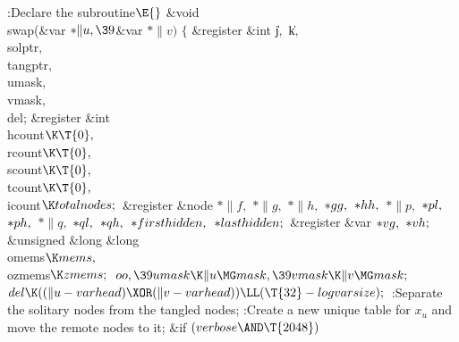 \Y\B\4:Declare the  subroutine\X${}\E{}$\6
\&{void} \\{swap}(\&{var} ${}{*}\|u,\39{}$\&{var} ${}{*}\|v){}$\1\1\2\2\6
${}\{{}$\1\6
\&{register} \&{int} \|j${},{}$ \|k${},{}$ \\{solptr}${},{}$ \\{tangptr}${},{}$
\\{umask}${},{}$ \\{vmask}${},{}$ \\{del};\6
\&{register} \&{int} \\{hcount}${}\K\T{0},{}$ \\{rcount}${}\K\T{0},{}$ %
\\{scount}${}\K\T{0},{}$ \\{tcount}${}\K\T{0},{}$ \\{icount}${}\K%
\\{totalnodes};{}$\6
\&{register} \&{node} ${}{*}\|f,{}$ ${}{*}\|g,{}$ ${}{*}\|h,{}$ ${}{*}%
\\{gg},{}$ ${}{*}\\{hh},{}$ ${}{*}\|p,{}$ ${}{*}\\{pl},{}$ ${}{*}\\{ph},{}$
${}{*}\|q,{}$ ${}{*}\\{ql},{}$ ${}{*}\\{qh},{}$ ${}{*}\\{firsthidden},{}$
${}{*}\\{lasthidden};{}$\6
\&{register} \&{var} ${}{*}\\{vg},{}$ ${}{*}\\{vh};{}$\6
\&{unsigned} \&{long} \&{long} \\{omems}${}\K\\{mems},{}$ \\{ozmems}${}\K%
\\{zmems};{}$\7
${}\\{oo},\39\\{umask}\K\|u\MG\\{mask},\39\\{vmask}\K\|v\MG\\{mask};{}$\6
${}\\{del}\K((\|u-\\{varhead})\XOR(\|v-\\{varhead}))\LL(\T{32}-%
\\{logvarsize});{}$\6
:Separate the solitary nodes from the tangled nodes\X;\6
:Create a new unique table for $x_u$ and move the remote nodes to it\X;\6
\&{if} ${}(\\{verbose}\AND\T{2048}){}$\1\5

